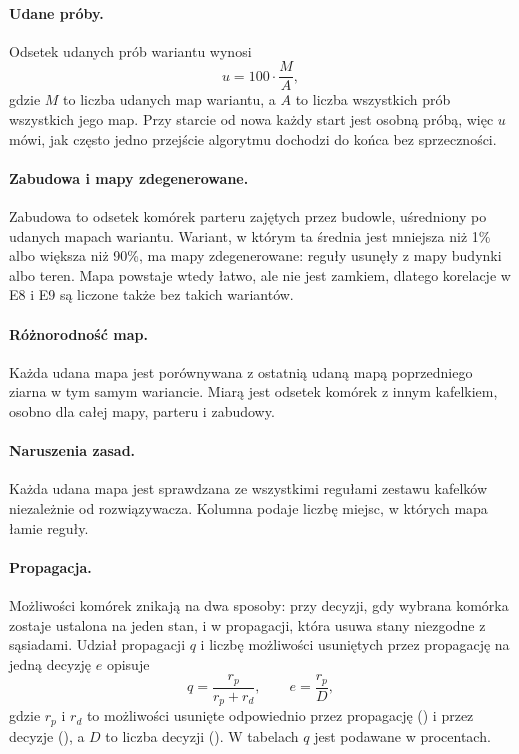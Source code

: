 \paragraph{Udane próby.} Odsetek udanych prób wariantu wynosi
\begin{equation}
  u = 100 \cdot \frac{M}{A} ,
  \label{eq:udane-proby}
\end{equation}
gdzie $M$ to liczba udanych map wariantu, a $A$ to liczba wszystkich prób wszystkich jego map. Przy starcie od nowa każdy start jest osobną próbą, więc $u$ mówi, jak często jedno przejście algorytmu dochodzi do końca bez sprzeczności.

\paragraph{Zabudowa i mapy zdegenerowane.} Zabudowa to odsetek komórek parteru zajętych przez budowle, uśredniony po udanych mapach wariantu. Wariant, w którym ta średnia jest mniejsza niż 1\% albo większa niż 90\%, ma mapy zdegenerowane: reguły usunęły z mapy budynki albo teren. Mapa powstaje wtedy łatwo, ale nie jest zamkiem, dlatego korelacje w E8 i E9 są liczone także bez takich wariantów.

\paragraph{Różnorodność map.} Każda udana mapa jest porównywana z ostatnią udaną mapą poprzedniego ziarna w tym samym wariancie. Miarą jest odsetek komórek z innym kafelkiem, osobno dla całej mapy, parteru i zabudowy.

\paragraph{Naruszenia zasad.} Każda udana mapa jest sprawdzana ze wszystkimi regułami zestawu kafelków niezależnie od rozwiązywacza. Kolumna  podaje liczbę miejsc, w których mapa łamie reguły.

\paragraph{Propagacja.} Możliwości komórek znikają na dwa sposoby: przy decyzji, gdy wybrana komórka zostaje ustalona na jeden stan, i w propagacji, która usuwa stany niezgodne z sąsiadami. Udział propagacji $q$ i liczbę możliwości usuniętych przez propagację na jedną decyzję $e$ opisuje
\begin{equation}
  q = \frac{r_p}{r_p + r_d} , \qquad e = \frac{r_p}{D} ,
  \label{eq:propagacja}
\end{equation}
gdzie $r_p$ i $r_d$ to możliwości usunięte odpowiednio przez propagację () i przez decyzje (), a $D$ to liczba decyzji (). W tabelach $q$ jest podawane w procentach.

